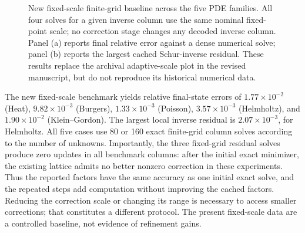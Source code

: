 \begin{figure}[t]
\centering
{}
\caption{New fixed-scale finite-grid baseline across the five PDE families.
All four solves for a given inverse column use the same nominal fixed-point
scale; no correction stage changes any decoded inverse column. Panel (a)
reports final relative error against a dense numerical solve; panel (b)
reports the largest cached Schur-inverse residual. These results replace the archival adaptive-scale plot in the revised manuscript,
but do not reproduce its historical numerical data.}
\label{fig:fixed_validation}
\end{figure}

The new fixed-scale benchmark yields relative final-state errors of
$1.77\times10^{-2}$ (Heat), $9.82\times10^{-3}$ (Burgers),
$1.33\times10^{-3}$ (Poisson), $3.57\times10^{-3}$ (Helmholtz), and
$1.90\times10^{-2}$ (Klein--Gordon). The largest local inverse residual is
$2.07\times10^{-3}$, for Helmholtz. All five cases use 80 or 160 exact
finite-grid column solves according to the number of unknowns.
Importantly, the three fixed-grid residual solves produce zero updates in
all benchmark columns: after the initial exact minimizer, the existing
lattice admits no better nonzero correction in these experiments. Thus the
reported factors have the same accuracy as one initial exact solve, and the
repeated steps add computation without improving the cached factors.
Reducing the correction scale or changing its range is necessary to access
smaller corrections; that constitutes a different protocol. The present
fixed-scale data are a controlled baseline, not evidence of refinement gains.

